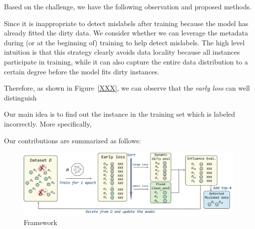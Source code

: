Based on the challenge, we have the following observation and proposed methods.




 Since it is inappropriate to detect mislabels after training because the model has already fitted the dirty data. We consider whether we can leverage the metadata during (or at the beginning of) training to help detect mislabels. The high level intuition is that this strategy clearly avoids data locality because all instances participate in training, while it can also capture the entire data distribution to a certain degree before the model fits dirty instances. 

Therefore, as shown in Figure~\ref{XXX}, we can observe that the \textit{early loss} can well distinguish 

Our main idea is to find out the instance in the training set which is labeled incorrectly.
More specifically, 

Our contributions are summarized as follows:


\begin{figure}
	\centering
	\includegraphics[width=\textwidth]{figures/framework}
	\caption{\sys Framework}
	\label{fig:framework}
\end{figure}


\be
	\item 
	\item 
	\item {}
\ee




